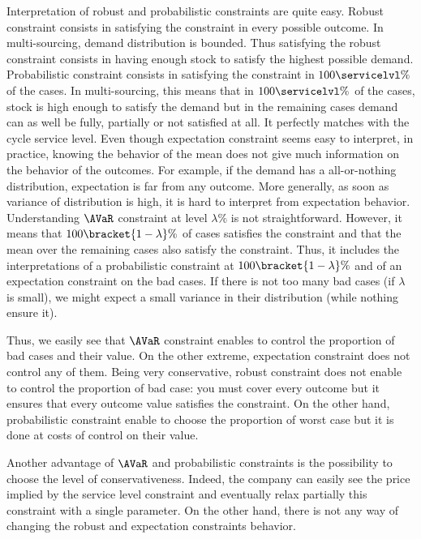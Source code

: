 Interpretation of robust and probabilistic constraints are quite easy.
Robust constraint consists in satisfying the constraint in every possible outcome.
In multi-sourcing, demand distribution is bounded.
Thus satisfying the robust constraint consists in having enough stock to satisfy the highest possible demand.
Probabilistic constraint consists in satisfying the constraint in $100\servicelvl\%$ of the cases.
In multi-sourcing, this means that in $100\servicelvl\%$ of the cases, stock is high enough to satisfy the demand but in the remaining cases demand can as well be fully, partially or not satisfied at all.
It perfectly matches with the cycle service level.
Even though expectation constraint seems easy to interpret, in practice, knowing the behavior of the mean does not give much information on the behavior of the outcomes.
For example, if the demand has a all-or-nothing distribution, expectation is far from any outcome.
More generally, as soon as variance of distribution is high, it is hard to interpret from expectation behavior.
Understanding $\AVaR$ constraint at level $\lambda\%$ is not straightforward.
However, it means that $100\bracket{1-\lambda}\%$ of cases satisfies the constraint and that the mean over the remaining cases also satisfy the constraint.
Thus, it includes the interpretations of a probabilistic constraint at $100\bracket{1-\lambda}\%$ and of an expectation constraint on the bad cases.
If there is not too many bad cases (\ie if $\lambda$ is small), we might expect a small variance in their distribution (while nothing ensure it).


Thus, we easily see that $\AVaR$ constraint enables to control the proportion of bad cases and their value.
On the other extreme, expectation constraint does not control any of them.
Being very conservative, robust constraint does not enable to control the proportion of bad case: you must cover every outcome but it ensures that every outcome value satisfies the constraint.
On the other hand, probabilistic constraint enable to choose the proportion of worst case but it is done at costs of control on their value.


Another advantage of $\AVaR$ and probabilistic constraints is the possibility to choose the level of conservativeness.
Indeed, the company can easily see the price implied by the service level constraint and eventually relax partially this constraint with a single parameter.
On the other hand, there is not any way of changing the robust and expectation constraints behavior.


